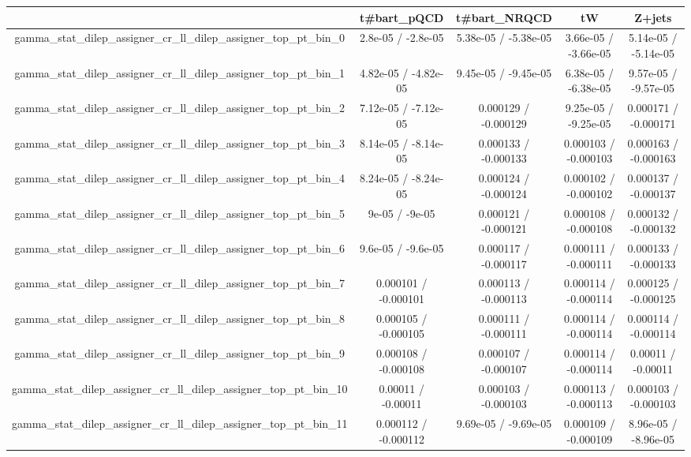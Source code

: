 \documentclass[10pt]{article}
\begin{document}
\begin{table}[htbp]
\begin{center}
\begin{tabular}{|c|c|c|c|c|}
\hline 
      & t#bar{t}_{pQCD}      & t#bar{t}_{NRQCD}      & tW      & Z+jets \\ 
\hline 
  gamma_stat_dilep_assigner_cr_ll_dilep_assigner_top_pt_bin_0 & 2.8e-05 / -2.8e-05 & 5.38e-05 / -5.38e-05 & 3.66e-05 / -3.66e-05 & 5.14e-05 / -5.14e-05 \\ 
  gamma_stat_dilep_assigner_cr_ll_dilep_assigner_top_pt_bin_1 & 4.82e-05 / -4.82e-05 & 9.45e-05 / -9.45e-05 & 6.38e-05 / -6.38e-05 & 9.57e-05 / -9.57e-05 \\ 
  gamma_stat_dilep_assigner_cr_ll_dilep_assigner_top_pt_bin_2 & 7.12e-05 / -7.12e-05 & 0.000129 / -0.000129 & 9.25e-05 / -9.25e-05 & 0.000171 / -0.000171 \\ 
  gamma_stat_dilep_assigner_cr_ll_dilep_assigner_top_pt_bin_3 & 8.14e-05 / -8.14e-05 & 0.000133 / -0.000133 & 0.000103 / -0.000103 & 0.000163 / -0.000163 \\ 
  gamma_stat_dilep_assigner_cr_ll_dilep_assigner_top_pt_bin_4 & 8.24e-05 / -8.24e-05 & 0.000124 / -0.000124 & 0.000102 / -0.000102 & 0.000137 / -0.000137 \\ 
  gamma_stat_dilep_assigner_cr_ll_dilep_assigner_top_pt_bin_5 & 9e-05 / -9e-05 & 0.000121 / -0.000121 & 0.000108 / -0.000108 & 0.000132 / -0.000132 \\ 
  gamma_stat_dilep_assigner_cr_ll_dilep_assigner_top_pt_bin_6 & 9.6e-05 / -9.6e-05 & 0.000117 / -0.000117 & 0.000111 / -0.000111 & 0.000133 / -0.000133 \\ 
  gamma_stat_dilep_assigner_cr_ll_dilep_assigner_top_pt_bin_7 & 0.000101 / -0.000101 & 0.000113 / -0.000113 & 0.000114 / -0.000114 & 0.000125 / -0.000125 \\ 
  gamma_stat_dilep_assigner_cr_ll_dilep_assigner_top_pt_bin_8 & 0.000105 / -0.000105 & 0.000111 / -0.000111 & 0.000114 / -0.000114 & 0.000114 / -0.000114 \\ 
  gamma_stat_dilep_assigner_cr_ll_dilep_assigner_top_pt_bin_9 & 0.000108 / -0.000108 & 0.000107 / -0.000107 & 0.000114 / -0.000114 & 0.00011 / -0.00011 \\ 
  gamma_stat_dilep_assigner_cr_ll_dilep_assigner_top_pt_bin_10 & 0.00011 / -0.00011 & 0.000103 / -0.000103 & 0.000113 / -0.000113 & 0.000103 / -0.000103 \\ 
  gamma_stat_dilep_assigner_cr_ll_dilep_assigner_top_pt_bin_11 & 0.000112 / -0.000112 & 9.69e-05 / -9.69e-05 & 0.000109 / -0.000109 & 8.96e-05 / -8.96e-05 \\ 

\end{tabular}
\end{center}
\end{table}
\end{document}
